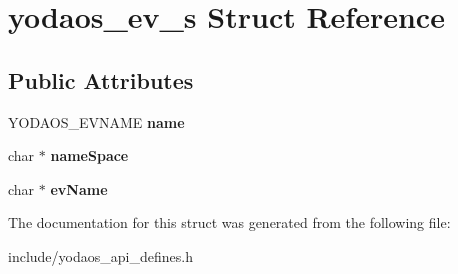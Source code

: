 \hypertarget{structyodaos__ev__s}{}\section{yodaos\+\_\+ev\+\_\+s Struct Reference}
\label{structyodaos__ev__s}
\subsection*{Public Attributes}
\begin{DoxyCompactItemize}
\item 
\mbox{\label{structyodaos__ev__s_a5f3019b0c93d3f46c0a2594951b8aaca}} 
Y\+O\+D\+A\+O\+S\+\_\+\+E\+V\+N\+A\+ME {\bfseries name}
\item 
\mbox{\label{structyodaos__ev__s_a7a2b51e64b2861cc0b750815fafc055d}} 
char $\ast$ {\bfseries name\+Space}
\item 
\mbox{\label{structyodaos__ev__s_ad5fea84c249f611887b55ec21c45c7e7}} 
char $\ast$ {\bfseries ev\+Name}
\end{DoxyCompactItemize}


The documentation for this struct was generated from the following file\+:\begin{DoxyCompactItemize}
\item 
include/yodaos\+\_\+api\+\_\+defines.\+h\end{DoxyCompactItemize}
